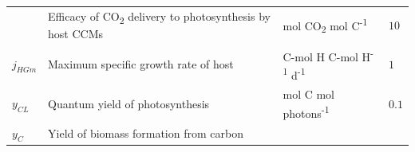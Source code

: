 \documentclass[]{elsarticle} %
\begin{document}
\begin{longtable}[]{@{}llll@{}}
\begin{minipage}[t]{0.09\columnwidth}
\end{minipage} & \begin{minipage}[t]{0.44\columnwidth}\raggedright\strut
Efficacy of CO\textsubscript{2} delivery to photosynthesis by host
CCMs\strut
\end{minipage} & \begin{minipage}[t]{0.24\columnwidth}\raggedright\strut
mol CO\textsubscript{2} mol C\textsuperscript{-1}\strut
\end{minipage} & \begin{minipage}[t]{0.12\columnwidth}\raggedright\strut
\(10\)\strut
\end{minipage}\tabularnewline
\begin{minipage}[t]{0.09\columnwidth}\raggedright\strut
\(j_{HGm}\)\strut
\end{minipage} & \begin{minipage}[t]{0.44\columnwidth}\raggedright\strut
Maximum specific growth rate of host\strut
\end{minipage} & \begin{minipage}[t]{0.24\columnwidth}\raggedright\strut
C-mol H C-mol H\textsuperscript{-1} d\textsuperscript{-1}\strut
\end{minipage} & \begin{minipage}[t]{0.12\columnwidth}\raggedright\strut
\(1\)\strut
\end{minipage}\tabularnewline
\begin{minipage}[t]{0.09\columnwidth}\raggedright\strut
\(y_{CL}\)\strut
\end{minipage} & \begin{minipage}[t]{0.44\columnwidth}\raggedright\strut
Quantum yield of photosynthesis\strut
\end{minipage} & \begin{minipage}[t]{0.24\columnwidth}\raggedright\strut
mol C mol photons\textsuperscript{-1}\strut
\end{minipage} & \begin{minipage}[t]{0.12\columnwidth}\raggedright\strut
\(0.1\)\strut
\end{minipage}\tabularnewline
\begin{minipage}[t]{0.09\columnwidth}\raggedright\strut
\(y_{C}\)\strut
\end{minipage} & \begin{minipage}[t]{0.44\columnwidth}\raggedright\strut
Yield of biomass formation from carbon\strut
\end{minipage} & \begin{minipage}[t]{0.24\columnwidth}\raggedright\strut

\end{minipage}
\end{longtable}
\end{document}
